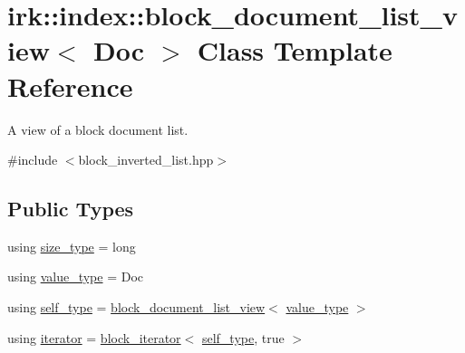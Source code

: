 \hypertarget{classirk_1_1index_1_1block__document__list__view}{}\section{irk\+:\+:index\+:\+:block\+\_\+document\+\_\+list\+\_\+view$<$ Doc $>$ Class Template Reference}
\label{classirk_1_1index_1_1block__document__list__view}


A view of a block document list.  




{\ttfamily \#include $<$block\+\_\+inverted\+\_\+list.\+hpp$>$}

\subsection*{Public Types}
\begin{DoxyCompactItemize}
\item 
using \mbox{\hyperlink{classirk_1_1index_1_1block__document__list__view_a29bf3e73748a771ec7f5c1e542d8bdb1}{size\+\_\+type}} = long
\item 
using \mbox{\hyperlink{classirk_1_1index_1_1block__document__list__view_a0741459717c42674c1cfe069ee876344}{value\+\_\+type}} = Doc
\item 
using \mbox{\hyperlink{classirk_1_1index_1_1block__document__list__view_a006662b07e3f2cd8f0c9709584e4f7f3}{self\+\_\+type}} = \mbox{\hyperlink{classirk_1_1index_1_1block__document__list__view}{block\+\_\+document\+\_\+list\+\_\+view}}$<$ \mbox{\hyperlink{classirk_1_1index_1_1block__document__list__view_a0741459717c42674c1cfe069ee876344}{value\+\_\+type}} $>$
\item 
using \mbox{\hyperlink{classirk_1_1index_1_1block__document__list__view_ac9190c4c0eb1b9cc20a1b6a5fbea1d80}{iterator}} = \mbox{\hyperlink{classirk_1_1index_1_1block__iterator}{block\+\_\+iterator}}$<$ \mbox{\hyperlink{classirk_1_1index_1_1block__document__list__view_a006662b07e3f2cd8f0c9709584e4f7f3}{self\+\_\+type}}, true $>$
\end{DoxyCompactItemize}
